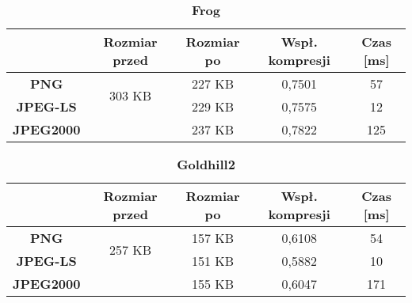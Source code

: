\begin{table}[!h]
	\centering
	\caption{\textbf{Frog}}
	\label{my-label}
	\begin{tabular}{|c|c|c|c|c|}                                             
		\hline
		& \textbf{Rozmiar przed} & \textbf{Rozmiar po} & \textbf{Wspł. kompresji} & \textbf{Czas {[}ms{]}} \\ \hline 
		\textbf{PNG}      &          \multicolumn{1}{c|}{\multirow{2}{*}{303 KB}}             &        227 KB             &    0,7501                      &           57                  \\\cline{3-5}
		\textbf{JPEG-LS}  &                        &      229 KB               &       0,7575                   &         12                 \\\cline{3-5}
		\textbf{JPEG2000} &                        &      237 KB               &       0,7822                   &      125                \\ \hline
	\end{tabular}
\end{table}

\begin{table}[!h]
	\centering
	\caption{\textbf{Goldhill2}}
	\label{my-label}
	\begin{tabular}{|c|c|c|c|c|}                                             
		\hline
		& \textbf{Rozmiar przed} & \textbf{Rozmiar po} & \textbf{Wspł. kompresji} & \textbf{Czas {[}ms{]}} \\ \hline 
		\textbf{PNG}      &          \multicolumn{1}{c|}{\multirow{2}{*}{257 KB}}             &        157 KB             &      0,6108                    &               54              \\\cline{3-5}
		\textbf{JPEG-LS}  &                        &       151 KB              &         0,5882                 &            10              \\\cline{3-5}
		\textbf{JPEG2000} &                        &       155 KB              &         0,6047                 &       171               \\ \hline
	\end{tabular}
\end{table}

